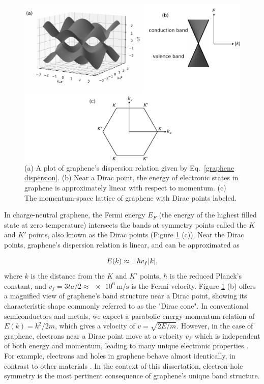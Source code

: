 \documentclass{beavtex_dub_edit}
\begin{document}
\begin{figure}
    \includegraphics[width = 1\textwidth]{Graphene band structure 3D.pdf}
    \caption{(a) A plot of graphene's dispersion relation given by Eq.\ \ref{graphene dispersion}. (b) Near a Dirac point, the energy of electronic states in graphene is approximately linear with respect to momentum. (c) The momentum-space lattice of graphene with Dirac points labeled.}
    \label{graphene dispersion plot}
\end{figure}
In charge-neutral graphene, the Fermi energy $E_F$ (the energy of the highest filled state at zero temperature) intersects the bands at symmetry points called the $K$ and $K'$ points, also known as the Dirac points (Figure \ref{graphene dispersion plot} (c)). Near the Dirac points, graphene's dispersion relation is linear, and can be approximated as



\begin{equation}
    E(k) \approx \pm \hbar v_f \abs{k}, \label{linear dispersion of graphene}
\end{equation}
where $k$ is the distance from the $K$ and $K'$ points, $\hbar$ is the reduced Planck's constant, and $v_f = 3ta/2 \approx \SI{e6}{\meter/\second}$ is the Fermi velocity. Figure \ref{graphene dispersion plot} (b) offers a magnified view of graphene's band structure near a Dirac point, showing its characteristic shape commonly referred to as the "Dirac cone". In conventional semiconductors and metals, we expect a parabolic energy-momentum relation of $E(k) = k^2/2m$, which gives a velocity of $v = \sqrt{2E/m}$. However, in the case of graphene, electrons near a Dirac point move at a velocity $v_F$ which is independent of both energy and momentum, leading to many unique electronic properties \cite{castro_neto_electronic_2009}. For example, electrons and holes in graphene behave almost identically, in contrast to other materials \cite{novoselov_electronic_2007,castro_neto_electronic_2009}. In the context of this dissertation, electron-hole symmetry is the most pertinent consequence of graphene’s unique band structure.
\end{document}
